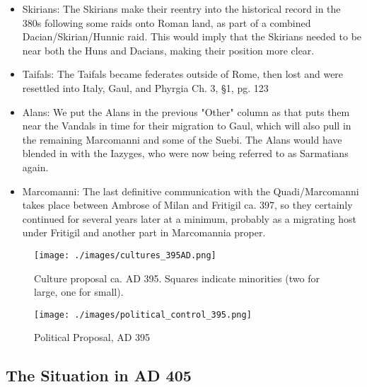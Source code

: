 \documentclass{article}
\newcommand{\specificCite}[1]{\tiny #1 \normalsize}
\begin{document}
\begin{itemize}
		\item Skirians:\newline
		The Skirians make their reentry into the historical record in the 380s following some raids onto Roman land, as part of a combined Dacian/Skirian/Hunnic raid.\newline
		This would imply that the Skirians needed to be near both the Huns and Dacians, making their position more clear.
		
		\item Taifals:\newline
		The Taifals became federates outside of Rome, then lost and were resettled into Italy, Gaul, and Phyrgia \cite{WolframHistoryOfTheGoths} \specificCite{Ch. 3, §1, pg. 123}
		
		\item Alans:\newline
		We put the Alans in the previous "Other" column as that puts them near the Vandals in time for their migration to Gaul, which will also pull in the remaining Marcomanni and some of the Suebi.\newline
		The Alans would have blended in with the Iazyges, who were now being referred to as Sarmatians again.\newline
		
		\item Marcomanni:\newline
		The last definitive communication with the Quadi/Marcomanni takes place between Ambrose of Milan and Fritigil ca. 397, so they certainly continued for several years later at a minimum, probably as a migrating host under Fritigil and another part in Marcomannia proper.
	\end{itemize}
	
	\newpage
	\begin{figure}[h!]
		\centering
		\texttt{[image: ./images/cultures\_395AD.png]}
		\caption{Culture proposal ca. AD 395. Squares indicate minorities (two for large, one for small).}
	\end{figure}
	
	\begin{figure}[h!]
		\centering
		\texttt{[image: ./images/political\_control\_395.png]}
		\caption{Political Proposal, AD 395}
	\end{figure}
	
	\newpage
	\subsection{The Situation in AD 405}
	\label{sec:timeline:subsec:405}
	
\end{document}
